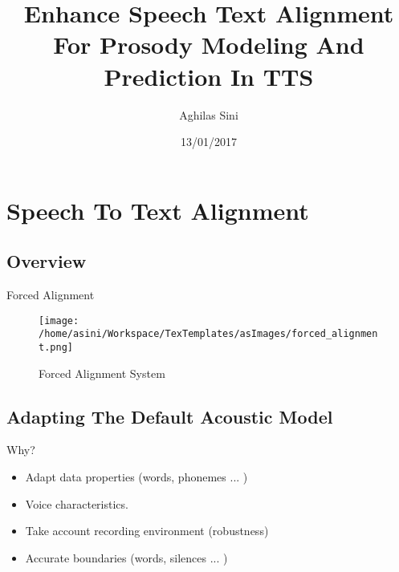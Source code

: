 \documentclass{beamer}
\title[Background and Literature]{Enhance Speech Text Alignment For Prosody Modeling And Prediction In TTS}
\author{Aghilas Sini}
\institute{Université de Rennes 1}
\date{13/01/2017}
\begin{document}
\begin{frame}
  \titlepage
\end{frame}



\section{Speech To Text Alignment}
%
\subsection{Overview}
\begin{frame}{Forced Alignment}

\begin{figure}[!h]
\begin{center}

   \texttt{[image: /home/asini/Workspace/TexTemplates/asImages/forced\_alignment.png]}
\caption{Forced Alignment System}
\end{center}

\end{figure}
	
	
	
	
\end{frame}
%
\subsection{Adapting The Default Acoustic Model}
\begin{frame}{Why?}
	\begin{itemize}
		\item Adapt data properties (words, phonemes ... )
		\item Voice characteristics.
		\item Take account recording environment (robustness)
		\item Accurate boundaries (words, silences ... )
	\end{itemize}

\end{frame}

%
\end{document}

